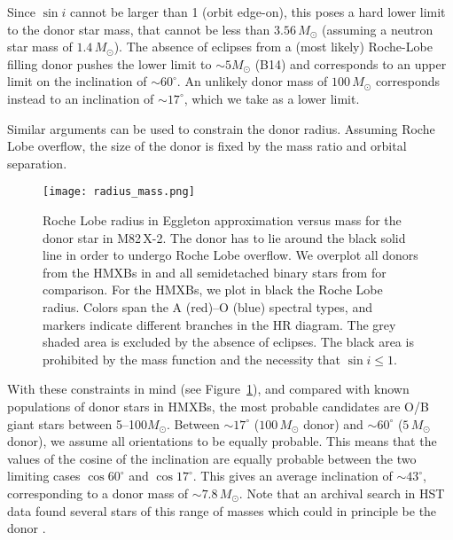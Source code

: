 \documentclass[twocolumn]{aastex631}
\newcommand{\Mtwo}{M82\,X-2\xspace}
\newcommand{\msun}{\ensuremath{M_{\odot}}\xspace}
\newcommand{\figref}{Figure~\ref}
\begin{document}
Since $\sin i$ cannot be larger than 1 (orbit edge-on), this poses a hard lower limit to the donor star mass, that cannot be less than $3.56\,\msun$ (assuming a neutron star mass of $1.4\,\msun$).
The absence of eclipses from a (most likely) Roche-Lobe filling donor pushes the lower limit to $\sim5\msun$ (B14) and corresponds to an upper limit on the inclination of $\sim60^{\circ}$.
An unlikely donor mass of $100\,\msun$ corresponds instead to an inclination of $\sim 17^{\circ}$, which we take as a lower limit.

Similar arguments can be used to constrain the donor radius.
Assuming Roche Lobe overflow, the size of the donor is fixed by the mass ratio and orbital separation.

\begin{figure}[ht]
    \centering
    \texttt{[image: radius\_mass.png]}
    \caption{Roche Lobe radius in Eggleton approximation \citep{eggletonApproximationsRadiiRoche1983} versus mass for the donor star in \Mtwo.
    The donor has to lie around the black solid line in order to undergo Roche Lobe overflow.
    We overplot all donors from the HMXBs in \citet{falangaEphemerisOrbitalDecay2015} and all semidetached binary stars from \citet{surkovacatalogue} for comparison.
    For the HMXBs, we plot in black the Roche Lobe radius.
    Colors span the A (red)--O (blue) spectral types, and markers indicate different branches in the HR diagram.
    The grey shaded area is excluded by the absence of eclipses.
    The black area is prohibited by the mass function and the necessity that $\sin i \leq 1$.}
    \label{fig:radiusmass}
\end{figure}

With these constraints in mind (see \figref{fig:radiusmass}), and compared with known populations of donor stars in HMXBs, the most probable candidates are O/B giant stars between 5--100$\msun$.
Between $\sim17^{\circ}$ ($100\,\msun$ donor) and $\sim60^{\circ}$ ($5\,\msun$ donor), we assume all orientations to be equally probable.
This means that the values of the cosine of the inclination are equally probable between the two limiting cases $\cos 60^{\circ}$ and $\cos 17^{\circ}$.
This gives an average inclination of $\sim43^{\circ}$, corresponding to a donor mass of $\sim7.8\,\msun$.
Note that an archival search in HST data found several stars of this range of masses which could in principle be the donor \citep{heidaSearchingDonorStars2019}.
\end{document}
